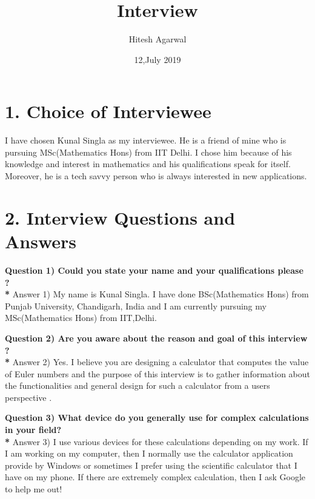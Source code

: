 \documentclass{article}
\begin{document}
\title{Interview}
\author{Hitesh Agarwal }
\date{12,July 2019}
\maketitle



\section*{1. Choice of Interviewee}

\noindent I have chosen Kunal Singla as my interviewee. He is a friend of mine who is pursuing MSc(Mathematics Hons) from IIT Delhi.
\noindent I chose him because of his knowledge and interest in mathematics and his qualifications speak for itself. Moreover, he is a tech savvy person who is always interested in new applications.

\section*{2. Interview Questions and Answers}
\noindent \textbf {Question 1) Could you state your name and your qualifications please ?\\*}
\noindent Answer 1) My name is Kunal Singla. I have done BSc(Mathematics Hons) from Punjab University, Chandigarh, India and I am currently pursuing my MSc(Mathematics Hons) from IIT,Delhi.
\begin{flushleft}
\hrulefill
\end{flushleft}



\noindent \textbf{Question 2) Are you aware about the reason and goal of this interview ?\\*}
\noindent Answer 2) Yes. I believe you are designing a calculator that computes the value of Euler numbers and the purpose of this interview is to gather information about the functionalities and general design for such a calculator from a users perspective .
\begin{flushleft}
\hrulefill
\end{flushleft}

\noindent \textbf {Question 3) What device do you generally use for complex calculations in your field?\\*}
\noindent Answer 3) I use various devices for these calculations depending on 
my work. If I am working on my computer, then I normally use the calculator application provide by Windows or sometimes I prefer using the scientific calculator that I have on my phone. If there are extremely complex calculation, then I ask Google to help me out!
\begin{flushleft}
\hrulefill
\end{flushleft}
\end{document}
